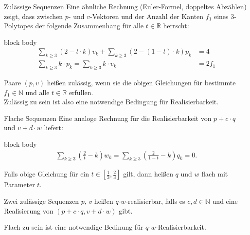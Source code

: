 \documentclass[10pt, notheorems]{beamer}
\newcommand{\nats}{\mathbb{N}}
\newcommand{\reals}{\mathbb{R}}
\newcommand{\hdef}[1]{\textcolor{darkred2}{#1}}
\begin{document}
\begin{frame}{Zulässige Sequenzen}
  Eine ähnliche Rechnung ({\sc Euler}-Formel, doppeltes Abzählen) zeigt, dass zwischen $p$- und $v$-Vektoren und der Anzahl der Kanten $f_1$ eines $3$-Polytopes der folgende Zusammenhang für alle $t \in \reals$ herrscht:
  \begin{beamercolorbox}[sep=-10pt,center,shadow=true,rounded=true]{block body}
    \begin{align*}
      \sum_{k\geq 3} (2 - t \cdot k ) v_k + \sum_{k\geq 3} ( 2 - (1 - t) \cdot k ) p_k &= 4\\
      \sum_{k\geq 3} k \cdot p_k = \sum_{k \geq 3} k \cdot v_k &= 2f_1
    \end{align*}
  \end{beamercolorbox}
  Paare $(p, v)$ heißen \hdef{zulässig}, wenn sie die obigen Gleichungen für bestimmte $f_1 \in \nats$ und alle $t \in \reals$ erfüllen.\\
  Zulässig zu sein ist also eine notwendige Bedingung für Realisierbarkeit.
\end{frame}

\begin{frame}{Flache Sequenzen}
  Eine analoge Rechnung für die Realisierbarkeit von $p+c\cdot q$ und $v+d\cdot w$ liefert:
  \begin{beamercolorbox}[sep=-10pt,center,shadow=true,rounded=true]{block body}
    \begin{align*}
      \sum_{k \geq 3} \left(\frac{2}{t} - k \right) w_k = \sum_{k \geq 3} \left( \frac{2}{1-t} - k \right) q_k = 0.
    \end{align*}
  \end{beamercolorbox}
  \pause
  Falls obige Gleichung für ein $t \in \left[\tfrac{1}{3}, \tfrac{2}{3}\right]$ gilt, dann heißen $q$ und $w$ \hdef{flach mit Parameter $t$}.
  \pause
  \begin{definition}
    Zwei zulässige Sequenzen $p$, $v$ heißen \hdef{$q$-$w$-realisierbar}, falls es $c, d \in \nats$ und eine Realisierung von $(p + c \cdot q, v + d \cdot w)$ gibt.
  \end{definition}
  \pause
  Flach zu sein ist eine notwendige Bedinung für $q$-$w$-Realisierbarkeit.
\end{frame}
\end{document}
